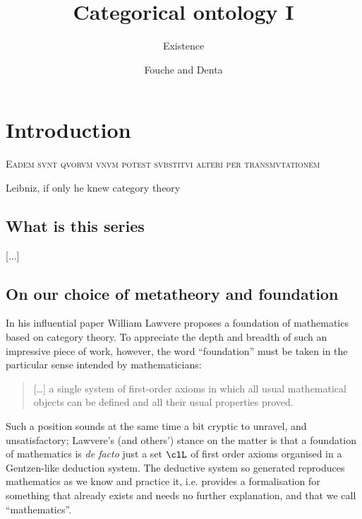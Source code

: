 \documentclass{amsart}
\author{Fouche and Denta}
\title{Categorical ontology I}
\subtitle{Existence}
\begin{document}
\maketitle
\begin{abstract}

\end{abstract}
\tableofcontents
\section{Introduction}
\epigraph{\textsc{Eadem svnt qvorvm vnvm potest svbstitvi alteri per transmvtationem}}{Leibniz, if only he knew category theory}
\subsection{What is this series}
[...]
\subsection{On our choice of metatheory and foundation}
In his influential paper \cite{} William Lawvere proposes a foundation of mathematics based on category theory. To appreciate the depth and breadth of such an impressive piece of work, however, the word ``foundation'' must be taken in the particular sense intended by mathematicians:
\begin{quote}
  [\dots\unkern] a single system of first-order axioms in which all usual mathematical objects can be defined and all their usual properties proved.
\end{quote}
Such a position sounds at the same time a bit cryptic to unravel, and unsatisfactory; Lawvere's (and others') stance on the matter is that a foundation of mathematics is \emph{de facto} just a set $\clL$ of first order axioms organised in a Gentzen-like deduction system. The deductive system so generated reproduces mathematics as we know and practice it, i.e. provides a formalisation for something that already exists and needs no further explanation, and that we call ``mathematics''.
\end{document}
